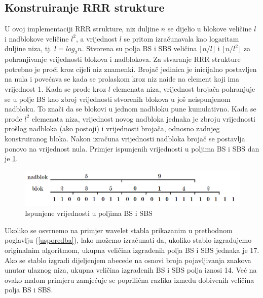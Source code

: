 \subsection{Konstruiranje RRR strukture}
U ovoj implementaciji RRR strukture, niz duljine $n$ se dijelio u blokove veličine $l$ i nadblokove veličine $l^2$, a vrijednost $l$ se pritom izračunavala kao logaritam duljine niza, tj. $l=log_2 n$. Stvorena su polja BS i SBS veličina $\lfloor n/l \rfloor$ i $\lfloor n/l^{2} \rfloor$ za pohranjivanje vrijednosti blokova i nadblokova. Za stvaranje RRR strukture potrebno je proći kroz cijeli niz znamenki. Brojač jedinica je inicijalno postavljen na nula i povećava se kada se prolaskom kroz niz naiđe na element koji ima vrijednost 1. Kada se prođe kroz $l$ elemenata niza, vrijednost brojača pohranjuje se u polje BS kao zbroj vrijednosti stvorenih blokova u još neispunjenom nadbloku. To znači da se blokovi u jednom nadbloku pune kumulativno. Kada se prođe $l^2$ elemenata niza, vrijednost novog nadbloka jednaka je zbroju vrijednosti prošlog nadbloka (ako postoji) i vrijednosti brojača, odnosno zadnjeg konstruiranog bloka. Nakon izračuna vrijednosti nadbloka brojač se postavlja ponovo na vrijednost nula. Primjer ispunjenih vrijednosti u poljima BS i SBS dan je \ref{rrr1}.

\begin{figure}[H]
\centering
\includegraphics[width=\linewidth]{./pictures/rrr1.png}
\caption{Ispunjene vrijednosti u poljima BS i SBS}\label{rrr1}
\end{figure}

Ukoliko se osvrnemo na primjer wavelet stabla prikazanim u prethodnom poglavlju (\ref{usporedba}), lako možemo izračunati da, ukoliko stablo izgrađujemo originalnim algoritmom, ukupna veličina izgrađenih polja BS i SBS jednaka je 17. Ako se stablo izgradi dijeljenjem abecede na osnovi broja pojavljivanja znakova unutar ulaznog niza, ukupna veličina izgrađenih BS i SBS polja iznosi 14. Već na ovako malom primjeru zamjećuje se poprilična razlika između dobivenih veličina polja BS i SBS.



